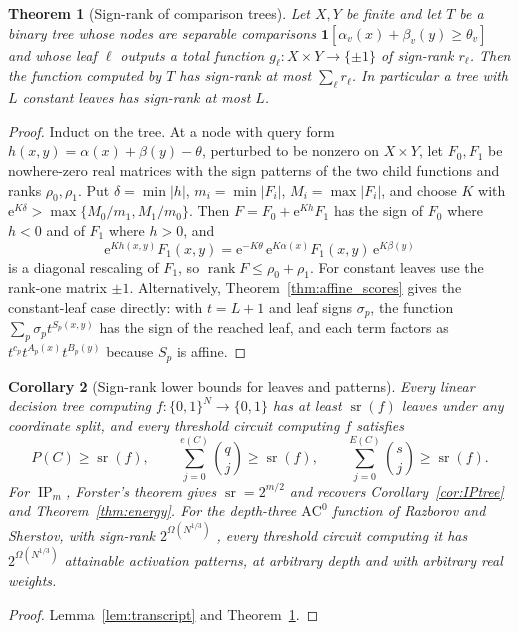 \documentclass[11pt]{article}
\newtheorem{theorem}{Theorem}[section]
\newtheorem{corollary}[theorem]{Corollary}
\theoremstyle{definition}
\newcommand{\bits}{\{0,1\}}
\newcommand{\ind}[1]{\mathbf 1[#1]}
\newcommand{\ip}{\operatorname{IP}}
\newcommand{\rank}{\operatorname{rank}}
\newcommand{\Eul}{\mathrm e}
\begin{document}
\begin{theorem}[Sign-rank of comparison trees]\label{thm:signrank_composition}
Let \(X,Y\) be finite and let \(T\) be a binary tree whose nodes are separable comparisons \(\ind{\alpha_v(x)+\beta_v(y)\ge\theta_v}\) and whose leaf \(\ell\) outputs a total function \(g_\ell:X\times Y\to\{\pm1\}\) of sign-rank \(r_\ell\). Then the function computed by \(T\) has sign-rank at most \(\sum_\ell r_\ell\). In particular a tree with \(L\) constant leaves has sign-rank at most \(L\).
\end{theorem}
\begin{proof}
Induct on the tree. At a node with query form \(h(x,y)=\alpha(x)+\beta(y)-\theta\), perturbed to be nonzero on \(X\times Y\), let \(F_0,F_1\) be nowhere-zero real matrices with the sign patterns of the two child functions and ranks \(\rho_0,\rho_1\). Put \(\delta=\min|h|\), \(m_i=\min|F_i|\), \(M_i=\max|F_i|\), and choose \(K\) with \(\Eul^{K\delta}>\max\{M_0/m_1,M_1/m_0\}\). Then \(F=F_0+\Eul^{Kh}F_1\) has the sign of \(F_0\) where \(h<0\) and of \(F_1\) where \(h>0\), and
\[
 \Eul^{Kh(x,y)}F_1(x,y)=\Eul^{-K\theta}\,\Eul^{K\alpha(x)}F_1(x,y)\,\Eul^{K\beta(y)}
\]
is a diagonal rescaling of \(F_1\), so \(\rank F\le\rho_0+\rho_1\). For constant leaves use the rank-one matrix \(\pm1\). Alternatively, Theorem~\ref{thm:affine_scores} gives the constant-leaf case directly: with \(t=L+1\) and leaf signs \(\sigma_p\), the function \(\sum_p\sigma_pt^{S_p(x,y)}\) has the sign of the reached leaf, and each term factors as \(t^{c_p}t^{A_p(x)}t^{B_p(y)}\) because \(S_p\) is affine.
\end{proof}

\begin{corollary}[Sign-rank lower bounds for leaves and patterns]\label{cor:signrank_patterns}
Every linear decision tree computing \(f:\bits^N\to\bits\) has at least \(\operatorname{sr}(f)\) leaves under any coordinate split, and every threshold circuit computing \(f\) satisfies
\[
 P(C)\ge\operatorname{sr}(f),\qquad
 \sum_{j=0}^{e(C)}\binom qj\ge\operatorname{sr}(f),\qquad
 \sum_{j=0}^{E(C)}\binom sj\ge\operatorname{sr}(f).
\]
For \(\ip_m\), Forster's theorem \cite{Forster02} gives \(\operatorname{sr}=2^{m/2}\) and recovers Corollary~\ref{cor:IPtree} and Theorem~\ref{thm:energy}. For the depth-three \(\mathrm{AC}^0\) function of Razborov and Sherstov, with sign-rank \(2^{\Omega(N^{1/3})}\) \cite{RS10}, every threshold circuit computing it has \(2^{\Omega(N^{1/3})}\) attainable activation patterns, at arbitrary depth and with arbitrary real weights.
\end{corollary}
\begin{proof}
Lemma~\ref{lem:transcript} and Theorem~\ref{thm:signrank_composition}.
\end{proof}
\end{document}
